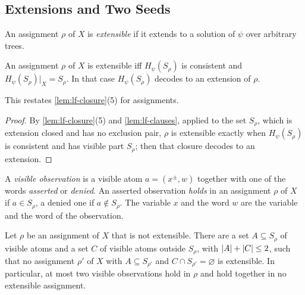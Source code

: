 \subsection{Extensions and Two Seeds}\label{sec:tc-seeds}

An assignment $\rho$ of $X$ is \emph{extensible} if it extends to a solution
of $\psi$ over arbitrary trees.

\begin{lemma}\label{lem:tc-extension}
An assignment $\rho$ of $X$ is extensible iff $H_\psi(S_\rho)$ is consistent
and $H_\psi(S_\rho)|_X=S_\rho$. In that case $H_\psi(S_\rho)$ decodes to an
extension of $\rho$.
\end{lemma}

This restates \cref{lem:lf-closure}(5) for assignments.

\begin{proof}
By \cref{lem:lf-closure}(5) and \cref{lem:lf-clauses}, applied to the set
$S_\rho$, which is extension closed and has no exclusion pair, $\rho$ is
extensible exactly when $H_\psi(S_\rho)$ is consistent and has visible part
$S_\rho$; then that closure decodes to an extension.
\end{proof}

\begin{definition}[Observations]\label{def:tc-observation}
A \emph{visible observation} is a visible atom $a=(x^\pm,w)$ together with one
of the words \emph{asserted} or \emph{denied}. An asserted observation
\emph{holds} in an assignment $\rho$ of $X$ if $a\in S_\rho$, a denied one if
$a\notin S_\rho$. The variable $x$ and the word $w$ are the variable and the
word of the observation.
\end{definition}

\begin{lemma}\label{lem:tc-two-seeds}
Let $\rho$ be an assignment of $X$ that is not extensible. There are a set
$A\subseteq S_\rho$ of visible atoms and a set $C$ of visible atoms outside
$S_\rho$, with $\lvert A\rvert+\lvert C\rvert\le2$, such that no assignment $\rho'$ of $X$
with $A\subseteq S_{\rho'}$ and $C\cap S_{\rho'}=\varnothing$ is extensible.
In particular, at most two visible observations hold in $\rho$ and hold
together in no extensible assignment.
\end{lemma}

